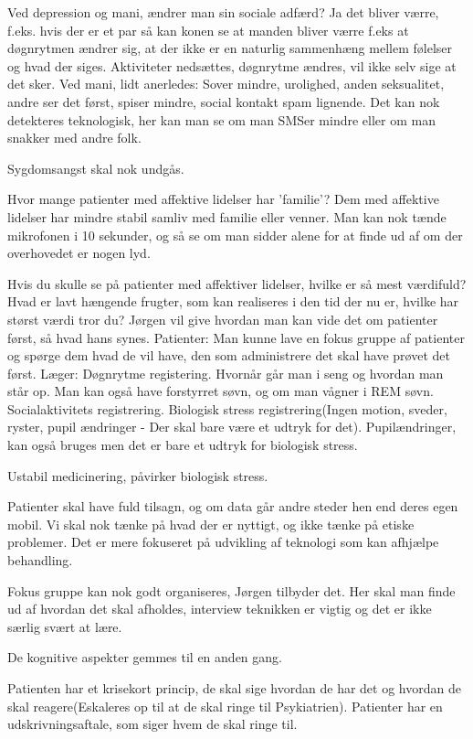 Ved depression og mani, ændrer man sin sociale adfærd? Ja det bliver værre, f.eks. hvis der er et par så kan konen se at manden bliver værre f.eks at døgnrytmen ændrer sig, at der ikke er en naturlig sammenhæng mellem følelser og hvad der siges. Aktiviteter nedsættes, døgnrytme ændres, vil ikke selv sige at det sker. Ved mani, lidt anerledes: Sover mindre, urolighed, anden seksualitet, andre ser det først, spiser mindre, social kontakt spam lignende. Det kan nok detekteres teknologisk, her kan man se om man SMSer mindre eller om man snakker med andre folk. 

Sygdomsangst skal nok undgås. 

Hvor mange patienter med affektive lidelser har 'familie'? Dem med affektive lidelser har mindre stabil samliv med familie eller venner. 
Man kan nok tænde mikrofonen i 10 sekunder, og så se om man sidder alene for at finde ud af om der overhovedet er nogen lyd.

Hvis du skulle se på patienter med affektiver lidelser, hvilke er så mest værdifuld? Hvad er lavt hængende frugter, som kan realiseres i den tid der nu er, hvilke har størst værdi tror du? Jørgen vil give hvordan man kan vide det om patienter først, så hvad hans synes.
Patienter: Man kunne lave en fokus gruppe af patienter og spørge dem hvad de vil have, den som administrere det skal have prøvet det først.
Læger: Døgnrytme registering. Hvornår går man i seng og hvordan man står op. Man kan også have forstyrret søvn, og om man vågner i REM søvn.
Socialaktivitets registrering.
Biologisk stress registrering(Ingen motion, sveder, ryster, pupil ændringer - Der skal bare være et udtryk for det). Pupilændringer, kan også bruges men det er bare et udtryk for biologisk stress.

Ustabil medicinering, påvirker biologisk stress. 

Patienter skal have fuld tilsagn, og om data går andre steder hen end deres egen mobil. Vi skal nok tænke på hvad der er nyttigt, og ikke tænke på etiske problemer. Det er mere fokuseret på udvikling af teknologi som kan afhjælpe behandling.

Fokus gruppe kan nok godt organiseres, Jørgen tilbyder det. Her skal man finde ud af hvordan det skal afholdes, interview teknikken er vigtig og det er ikke særlig svært at lære.

De kognitive aspekter gemmes til en anden gang. 

Patienten har et krisekort princip, de skal sige hvordan de har det og hvordan de skal reagere(Eskaleres op til at de skal ringe til Psykiatrien). Patienter har en udskrivningsaftale, som siger hvem de skal ringe til. 

